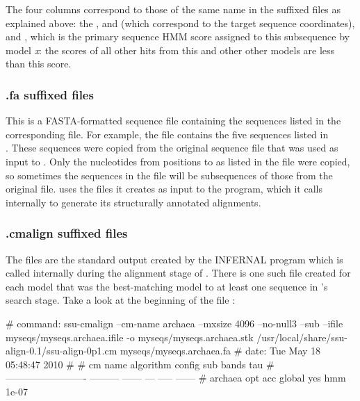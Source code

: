 The four columns correspond to those of the same name in the 
suffixed files as explained above: the ,
 and  (which correspond to the target sequence
coordinates), and , which is the primary sequence HMM
score assigned to this subsequence by model \emph{x}: the scores of
all other hits from this and other other models are less than
this score.

\subsubsection{.fa suffixed files}
This is a FASTA-formatted sequence file containing the sequences
listed in the corresponding  file. For example, the
file  contains the five sequences
listed in \\
. These sequences were
copied from the original sequence file  that
was used as input to . Only the nucleotides from
positions  to  as listed in the
 file were copied, so sometimes the sequences in the
 file will be subsequences of those from the original
file.   uses the  files it
creates as input to the  program, which it calls
internally to generate its structurally annotated alignments.

\subsubsection{.cmalign suffixed files}

The  files are the standard output created by the
INFERNAL program  which is called internally
during the alignment stage of . There is one such file
created for each model that was the best-matching model to at least
one sequence in 's search stage. Take a look at the
beginning of the file :

\begin{sreoutputwide}
# command: ssu-cmalign --cm-name archaea --mxsize 4096 --no-null3 --sub --ifile myseqs/myseqs.archaea.ifile 
-o myseqs/myseqs.archaea.stk /usr/local/share/ssu-align-0.1/ssu-align-0p1.cm myseqs/myseqs.archaea.fa
# date:    Tue May 18 05:48:47 2010
#
# cm name                    algorithm  config  sub  bands     tau
# -------------------------  ---------  ------  ---  -----  ------
# archaea                      opt acc  global  yes    hmm   1e-07
\end{sreoutputwide}

